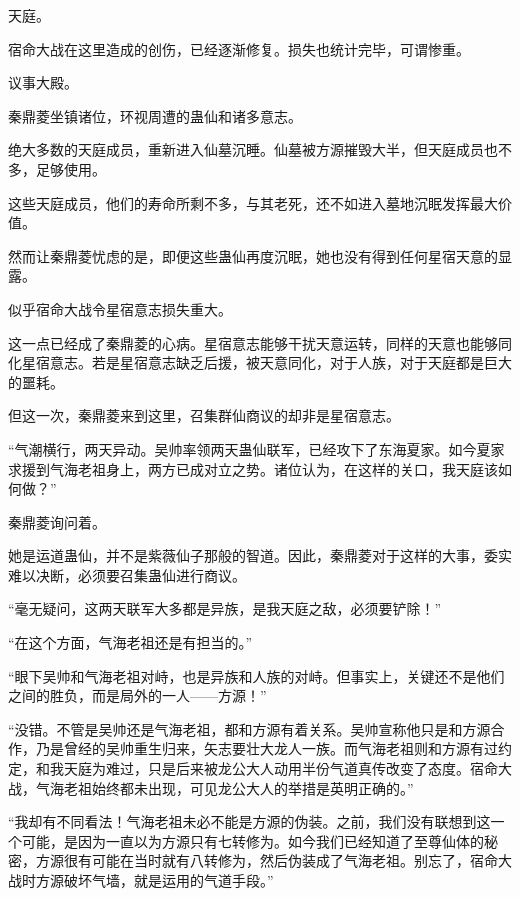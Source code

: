 
\begin{this_body}



天庭。

宿命大战在这里造成的创伤，已经逐渐修复。损失也统计完毕，可谓惨重。

议事大殿。

秦鼎菱坐镇诸位，环视周遭的蛊仙和诸多意志。

绝大多数的天庭成员，重新进入仙墓沉睡。仙墓被方源摧毁大半，但天庭成员也不多，足够使用。

这些天庭成员，他们的寿命所剩不多，与其老死，还不如进入墓地沉眠发挥最大价值。

然而让秦鼎菱忧虑的是，即便这些蛊仙再度沉眠，她也没有得到任何星宿天意的显露。

似乎宿命大战令星宿意志损失重大。

这一点已经成了秦鼎菱的心病。星宿意志能够干扰天意运转，同样的天意也能够同化星宿意志。若是星宿意志缺乏后援，被天意同化，对于人族，对于天庭都是巨大的噩耗。

但这一次，秦鼎菱来到这里，召集群仙商议的却非是星宿意志。

“气潮横行，两天异动。吴帅率领两天蛊仙联军，已经攻下了东海夏家。如今夏家求援到气海老祖身上，两方已成对立之势。诸位认为，在这样的关口，我天庭该如何做？”

秦鼎菱询问着。

她是运道蛊仙，并不是紫薇仙子那般的智道。因此，秦鼎菱对于这样的大事，委实难以决断，必须要召集蛊仙进行商议。

“毫无疑问，这两天联军大多都是异族，是我天庭之敌，必须要铲除！”

“在这个方面，气海老祖还是有担当的。”

“眼下吴帅和气海老祖对峙，也是异族和人族的对峙。但事实上，关键还不是他们之间的胜负，而是局外的一人——方源！”

“没错。不管是吴帅还是气海老祖，都和方源有着关系。吴帅宣称他只是和方源合作，乃是曾经的吴帅重生归来，矢志要壮大龙人一族。而气海老祖则和方源有过约定，和我天庭为难过，只是后来被龙公大人动用半份气道真传改变了态度。宿命大战，气海老祖始终都未出现，可见龙公大人的举措是英明正确的。”

“我却有不同看法！气海老祖未必不能是方源的伪装。之前，我们没有联想到这一个可能，是因为一直以为方源只有七转修为。如今我们已经知道了至尊仙体的秘密，方源很有可能在当时就有八转修为，然后伪装成了气海老祖。别忘了，宿命大战时方源破坏气墙，就是运用的气道手段。”


\end{this_body}
